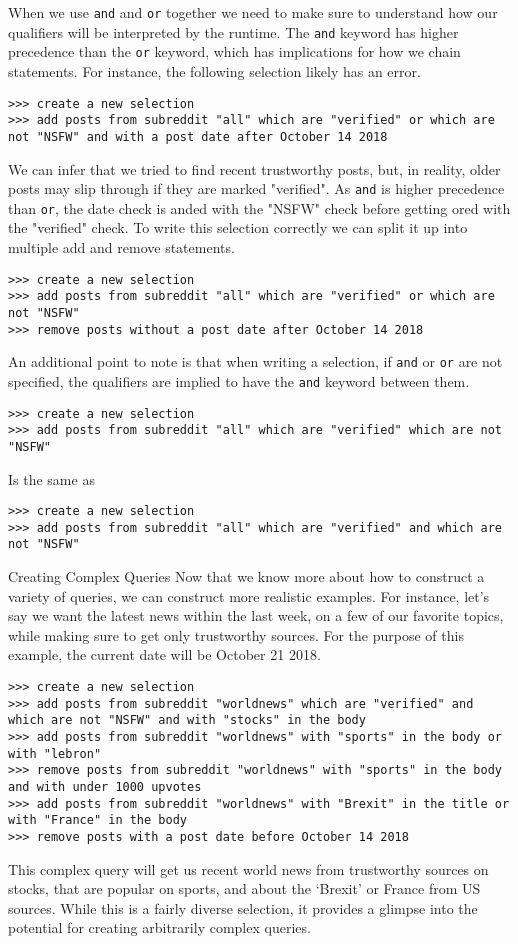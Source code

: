 When we use \texttt{and} and \texttt{or} together we need to make sure to understand how our qualifiers will be interpreted by the runtime. The \texttt{and} keyword has higher precedence than the \texttt{or} keyword, which has implications for how we chain statements. For instance, the following selection likely has an error.
\begin{lstlisting}
>>> create a new selection
>>> add posts from subreddit "all" which are "verified" or which are not "NSFW" and with a post date after October 14 2018
\end{lstlisting}
We can infer that we tried to find recent trustworthy posts, but, in reality, older posts may slip through if they are marked "verified". As \texttt{and} is higher precedence than \texttt{or}, the date check is anded with the "NSFW" check before getting ored with the "verified" check. To write this selection correctly we can split it up into multiple add and remove statements.
\begin{lstlisting}
>>> create a new selection
>>> add posts from subreddit "all" which are "verified" or which are not "NSFW"
>>> remove posts without a post date after October 14 2018
\end{lstlisting}
An additional point to note is that when writing a selection, if \texttt{and} or \texttt{or} are not specified, the qualifiers are implied to have the \texttt{and} keyword between them.
\begin{lstlisting}
>>> create a new selection
>>> add posts from subreddit "all" which are "verified" which are not "NSFW"
\end{lstlisting}
Is the same as
\begin{lstlisting}
>>> create a new selection
>>> add posts from subreddit "all" which are "verified" and which are not "NSFW"
\end{lstlisting}
Creating Complex Queries
Now that we know more about how to construct a variety of queries, we can construct more realistic examples. For instance, let’s say we want the latest news within the last week, on a few of our favorite topics, while making sure to get only trustworthy sources. For the purpose of this example, the current date will be October 21 2018.
\begin{lstlisting}
>>> create a new selection
>>> add posts from subreddit "worldnews" which are "verified" and which are not "NSFW" and with "stocks" in the body
>>> add posts from subreddit "worldnews" with "sports" in the body or with "lebron"
>>> remove posts from subreddit "worldnews" with "sports" in the body and with under 1000 upvotes
>>> add posts from subreddit "worldnews" with "Brexit" in the title or with "France" in the body
>>> remove posts with a post date before October 14 2018
\end{lstlisting}
This complex query will get us recent world news from trustworthy sources on stocks, that are popular on sports, and about the ‘Brexit’ or France from US sources. While this is a fairly diverse selection, it provides a glimpse into the potential for creating arbitrarily complex queries.

